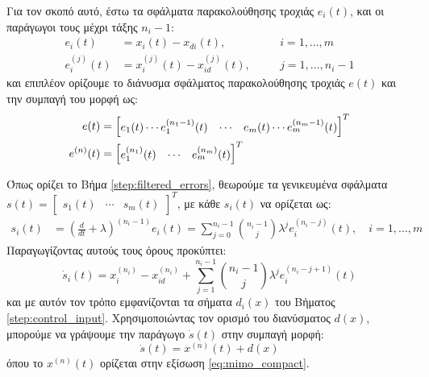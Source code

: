 Για τον σκοπό αυτό, έστω τα σφάλματα παρακολούθησης τροχιάς $e_i(t)$, και οι παράγωγοι τους μέχρι τάξης $n_i - 1$:
\begin{equation}
\begin{alignedat}{2}
	e_i(t) &= x_i(t) - x_{di}(t), \quad  &&i=1,\dots,m  \\
	e_i^{(j)}(t) &= x_i^{(j)}(t) - x_{id}^{(j)}(t), \quad &&j = 1,\dots, n_i - 1 
	\end{alignedat}
\end{equation}
και επιπλέον ορίζουμε το διάνυσμα σφάλματος παρακολούθησης τροχιάς $e(t)$ και την συμπαγή του μορφή ως:
\begin{equation}
\begin{split}
	e(t) &= 
	\bmqty{ e_1(t) \cdots e_1^{(n_1 -1)}(t) 
	&\cdots&
	e_m(t) \cdots e_m^{(n_m -1)}(t)
	}^T  \\
	e^{(n)}(t) &= \bmqty{ e_1^{(n_1)}(t) &\cdots& e_m^{(n_m)}(t) }^T
	\label{eq:state_errors}
	\end{split}
\end{equation}

Όπως ορίζει το Βήμα \ref{step:filtered_errors}, θεωρούμε τα γενικευμένα σφάλματα $s(t) = \begin{bmatrix}s_1(t) & \cdots & s_m(t) \end{bmatrix}^T$, με κάθε $s_i(t)$ να ορίζεται ως:
\begin{equation}
\begin{split}
	s_i(t) &= \left( 
	\frac{d}{dt} + \lambda
	\right)^{(n_i - 1)} e_i(t) 
	= \sum_{j=0}^{n_i-1}\binom{n_i-1}{j} \lambda^j e_i^{(n_i-j)}(t), \quad i=1,\dots,m 
	\label{} 
	\end{split}
\end{equation}
Παραγωγίζοντας αυτούς τους όρους προκύπτει:
\begin{equation}
	\dot{s}_i(t) = x_i^{(n_i)} - x_{id}^{(n_i)} 
	+ \sum_{j=1}^{n_i-1}\binom{n_i-1}{j}
	\lambda^j e_i^{(n_i-j+1)}(t) 
	\label{eq:s_der}
\end{equation}
και με αυτόν τον τρόπο εμφανίζονται τα σήματα $d_i(x)$ του Βήματος \ref{step:control_input}. Χρησιμοποιώντας τον ορισμό του διανύσματος $d(x)$, μπορούμε να γράψουμε την παράγωγο $\dot{s}(t)$ στην συμπαγή μορφή:
\begin{equation*}
\dot{s}(t) = x^{(n)}(t) + d(x)
\end{equation*}
όπου το $x^{(n)}(t)$ ορίζεται στην εξίσωση \eqref{eq:mimo_compact}.

